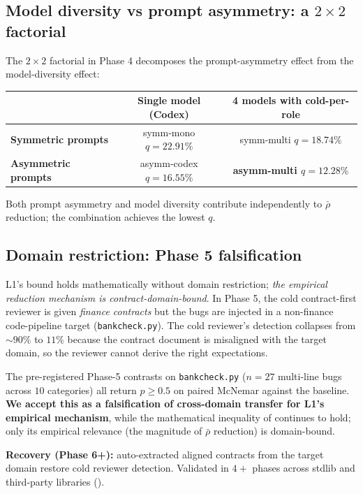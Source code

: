\subsection{Model diversity vs prompt asymmetry: a $2 \times 2$ factorial}

The $2 \times 2$ factorial in Phase 4 decomposes the prompt-asymmetry effect from the model-diversity effect:
\begin{center}
\small
\begin{tabular}{@{}lcc@{}}
\toprule
 & \textbf{Single model (Codex)} & \textbf{4 models with cold-per-role} \\
\midrule
\textbf{Symmetric prompts} & symm-mono $q = 22.91\%$ & symm-multi $q = 18.74\%$ \\
\textbf{Asymmetric prompts} & asymm-codex $q = 16.55\%$ & \textbf{asymm-multi $q = 12.28\%$} \\
\bottomrule
\end{tabular}
\end{center}

Both prompt asymmetry and model diversity contribute independently to $\bar{\rho}$ reduction; the combination achieves the lowest $q$.

\subsection{Domain restriction: Phase 5 falsification}

L1's bound holds mathematically without domain restriction; \emph{the empirical reduction mechanism is contract-domain-bound}. In Phase 5, the cold contract-first reviewer is given \emph{finance contracts} but the bugs are injected in a non-finance code-pipeline target (\texttt{bankcheck.py}). The cold reviewer's detection collapses from $\sim\!90\%$ to $11\%$ because the contract document is misaligned with the target domain, so the reviewer cannot derive the right expectations.

The pre-registered Phase-5 contrasts on \texttt{bankcheck.py} ($n = 27$ multi-line bugs across $10$ categories) all return $p \ge 0.5$ on paired McNemar against the baseline. \textbf{We accept this as a falsification of cross-domain transfer for L1's empirical mechanism}, while the mathematical inequality of  continues to hold; only its empirical relevance (the magnitude of $\bar{\rho}$ reduction) is domain-bound.

\textbf{Recovery (Phase 6+):} auto-extracted aligned contracts from the target domain restore cold reviewer detection. Validated in $4+$ phases across stdlib and third-party libraries ().
